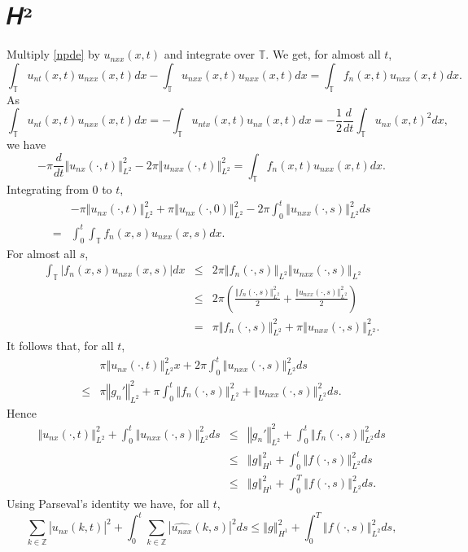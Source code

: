 \documentclass{article}
\newcommand{\norm}[1]{\left\Vert #1 \right\Vert}
\begin{document}
\section{𝐻²}
Multiply \eqref{npde} by $u_{nxx}(x,t)$ and integrate over $\mathbb{T}$. We get, for almost all $t$,
\[
\int_\mathbb{T} u_{nt}(x,t)u_{nxx}(x,t) dx- \int_\mathbb{T} u_{nxx}(x,t) u_{nxx}(x,t) dx = \int_\mathbb{T} f_n(x,t) u_{nxx}(x,t) dx.
\]
As
\[
\int_\mathbb{T} u_{nt}(x,t)u_{nxx}(x,t) dx = -\int_\mathbb{T} u_{ntx}(x,t) u_{nx}(x,t)dx
=-\frac{1}{2} \frac{d}{dt} \int_\mathbb{T} u_{nx}(x,t)^2 dx,
\]
we have
\[
-\pi \frac{d}{dt} \norm{u_{nx}(\cdot,t)}_{L^2}^2-2\pi \norm{u_{nxx}(\cdot,t)}_{L^2}^2=\int_\mathbb{T} f_n(x,t) u_{nxx}(x,t) dx.
\]
Integrating from $0$ to $t$,
\[
\begin{split}
&-\pi \norm{u_{nx}(\cdot,t)}_{L^2}^2+\pi \norm{u_{nx}(\cdot,0)}_{L^2}^2-2\pi \int_0^t \norm{u_{nxx}(\cdot,s)}_{L^2}^2 ds\\
=&
\int_0^t \int_\mathbb{T} f_n(x,s) u_{nxx}(x,s) dx.
\end{split}
\]
For almost all $s$,
\begin{eqnarray*}
\int_\mathbb{T} |f_n(x,s) u_{nxx}(x,s)| dx &\leq&
2\pi \norm{f_n(\cdot,s)}_{L^2} \norm{u_{nxx}(\cdot,s)}_{L^2}\\
&\leq& 2\pi \left(\frac{\norm{f_n(\cdot,s)}_{L^2}^2}{2}+ \frac{\norm{u_{nxx}(\cdot,s)}_{L^2}^2}{2} \right)\\
&=&\pi \norm{f_n(\cdot,s)}_{L^2}^2 + \pi \norm{u_{nxx}(\cdot,s)}_{L^2}^2.
\end{eqnarray*}
It follows that, for all $t$,
\[
\begin{split}
&\pi \norm{u_{nx}(\cdot,t)}_{L^2}^2x  + 2\pi \int_0^t \norm{u_{nxx}(\cdot,s)}_{L^2}^2 ds\\
\leq&\pi \norm{g_n'}_{L^2}^2+\pi \int_0^t \norm{f_n(\cdot,s)}_{L^2}^2 + \norm{u_{nxx}(\cdot,s)}_{L^2}^2 ds.
\end{split}
\]
Hence
\begin{eqnarray*}
\norm{u_{nx}(\cdot,t)}_{L^2}^2 +  \int_0^t \norm{u_{nxx}(\cdot,s)}_{L^2}^2 ds& \leq& \norm{g_n'}_{L^2}^2 + \int_0^t \norm{f_n(\cdot,s)}_{L^2}^2 ds\\
&\leq&\norm{g}_{H^1}^2 +  \int_0^t \norm{f(\cdot,s)}_{L^2}^2 ds\\
&\leq&\norm{g}_{H^1}^2 +  \int_0^T \norm{f(\cdot,s)}_{L^2}^2 ds.
\end{eqnarray*}
Using Parseval's identity we have, for  all $t$,
\[
\sum_{k \in \mathbb{Z}} | \widehat{u_{nx}}(k,t)|^2 + \int_0^t \sum_{k \in \mathbb{Z}} |\widehat{u_{nxx}}(k,s)|^2 ds\leq \norm{g}_{H^1}^2 +  \int_0^T \norm{f(\cdot,s)}_{L^2}^2 ds,
\]
\end{document}
